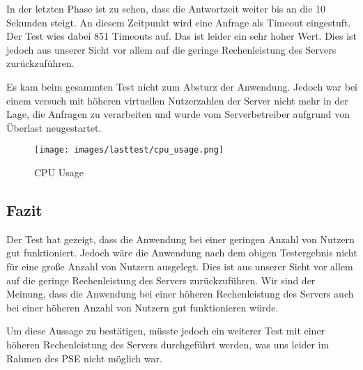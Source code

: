 \documentclass{qualitätssicherungsheft}
\begin{document}
In der letzten Phase ist zu sehen, dass die Antwortzeit weiter bis an die 10 Sekunden steigt. An diesem Zeitpunkt wird eine Anfrage als Timeout eingestuft. Der Test wies dabei 851 Timeouts auf. Das ist leider ein sehr hoher Wert. Dies ist jedoch aus unserer Sicht vor allem auf die geringe Rechenleistung des Servers zurückzuführen. 

Es kam beim gesammten Test nicht zum Absturz der Anwendung.
Jedoch war bei einem versuch mit höheren virtuellen Nutzerzahlen der Server nicht mehr in der Lage, die Anfragen zu verarbeiten und wurde vom Serverbetreiber aufgrund von Überlast neugestartet.

\begin{figure}
    \centering
        \texttt{[image: images/lasttest/cpu\_usage.png]}
        \caption[center]{CPU Usage}
        \label{fig:cpu_usage}
\end{figure}

\subsection{Fazit}
Der Test hat gezeigt, dass die Anwendung bei einer geringen Anzahl von Nutzern gut funktioniert. Jedoch wäre die Anwendung nach dem obigen Testergebnis nicht für eine große Anzahl von Nutzern ausgelegt. Dies ist aus unserer Sicht vor allem auf die geringe Rechenleistung des Servers zurückzuführen. Wir sind der Meinung, dass die Anwendung bei einer höheren Rechenleistung des Servers auch bei einer höheren Anzahl von Nutzern gut funktionieren würde.

Um diese Aussage zu bestätigen, müsste jedoch ein weiterer Test mit einer höheren Rechenleistung des Servers durchgeführt werden, was uns leider im Rahmen des PSE nicht möglich war.
\end{document}
